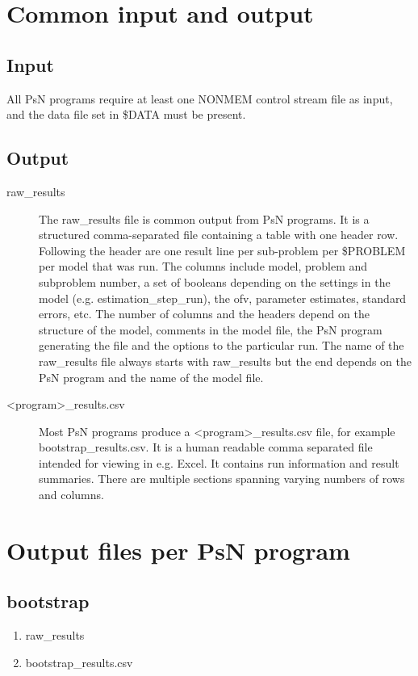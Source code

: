 



\maketitle
\section{Common input and output}
\subsection{Input}
All PsN programs require at least one NONMEM control stream file as input, 
and the data file set in \$DATA must be present.
\subsection{Output}
\begin{description}
\item[raw\_results]
The raw\_results file is common output from PsN programs. It is a structured
comma-separated file containing a table with one header row. Following the header are one result
line per sub-problem per \$PROBLEM per model that was run.
The columns include model, problem and subproblem number, a 
set of booleans depending on the settings in the model
(e.g. estimation\_step\_run), the ofv, parameter estimates, standard errors,
etc. The number of columns and the headers depend on the structure of the model,
comments in the model file, the PsN program generating the file and the options
to the particular run.
The name of the raw\_results file always starts with raw\_results but the end depends on the 
PsN program and the name of the model file.
\item[<program>\_results.csv]
Most PsN programs produce a <program>\_results.csv file, for example bootstrap\_results.csv. 
It is a human readable comma separated file intended for viewing in e.g. Excel. 
It contains run information and 
result summaries. There are multiple sections spanning varying numbers of rows and columns.
\end{description}

\section{Output files per PsN program}
\subsection{bootstrap}
\begin{enumerate}
\item raw\_results 
\item bootstrap\_results.csv 
\end{enumerate}
